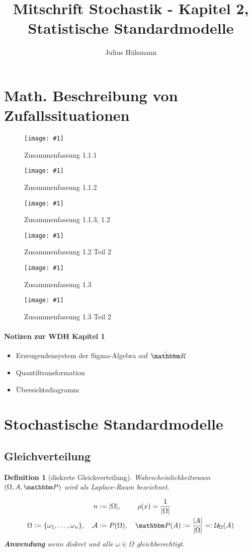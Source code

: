\documentclass[a4paper,12pt]{article}%
\title{Mitschrift Stochastik - Kapitel 2, Statistische Standardmodelle}
\author{Julius Hülsmann}
\newtheorem{myDef}[thm]{Definition}
\newcommand{\R}{\mathbbm R}
\newcommand{\A}{\mathcal{A}}
\newcommand{\U}{\mathcal{U}}
\newcommand{\PP}{\mathbbm P}
\newcommand{\grafik}[2]{\begin{figure}[!htb]
		\noindent\texttt{[image: \#1]}
		\caption{\textrm{#2}}%
	\end{figure}}
\begin{document}
	\maketitle
	\tableofcontents
	\newpage
	\section{Math. Beschreibung von Zufallssituationen}
	
	\grafik{../src/01.png}{Zusammenfassung 1.1.1}
	\grafik{../src/02.png}{Zusammenfassung 1.1.2}
	\grafik{../src/03.png}{Zusammenfassung 1.1.3, 1.2}
	\grafik{../src/04.png}{Zusammenfassung 1.2 Teil 2}
	\grafik{../src/05.png}{Zusammenfassung 1.3}
	\grafik{../src/06.png}{Zusammenfassung 1.3 Teil 2}
	
	\paragraph{Notizen zur WDH Kapitel 1}
	\begin{itemize}
		\item Erzeugendensystem der Sigma-Algebra auf $\bar \R$
		\item Quantiltransformation
		\item Übersichtsdiagramm
	\end{itemize}
	
	
	
	\newpage
	\section{Stochastische Standardmodelle}
	\subsection{Gleichverteilung }
	
	\begin{myDef}[diskrete Gleichverteilung]
		
		Wahrscheinlichkeitsraum $(\Omega, A, \PP)$ wird als Laplace-Raum bezeichnet.
		
		\begin{align*}
		n &:= | \Omega |, \quad~~~~ \rho(x) = \frac{1}{|\Omega|}
		\\
		\Omega := \{\omega_1, \dots, \omega_n\}, \quad
		\A &:= P(\Omega),\quad
		\PP(A) := \frac{|A|}{|\Omega|} =: \U_\Omega(A)
		\end{align*}
		{\bf Anwendung} wenn diskret und alle $\omega \in \Omega$ gleichberechtigt.
		
	\end{myDef}
	
\end{document}
